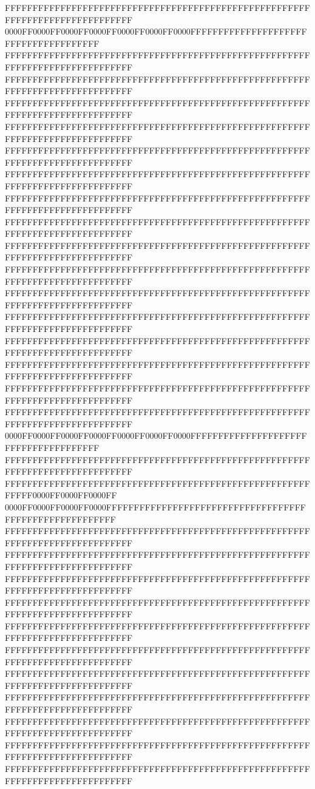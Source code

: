 FFFFFFFFFFFFFFFFFFFFFFFFFFFFFFFFFFFFFFFFFFFFFFFFFFFFFFFFFFFFFFFFFFFFFFFFFFFFFF
0000FF0000FF0000FF0000FF0000FF0000FF0000FFFFFFFFFFFFFFFFFFFFFFFFFFFFFFFFFFFFFF
FFFFFFFFFFFFFFFFFFFFFFFFFFFFFFFFFFFFFFFFFFFFFFFFFFFFFFFFFFFFFFFFFFFFFFFFFFFFFF
FFFFFFFFFFFFFFFFFFFFFFFFFFFFFFFFFFFFFFFFFFFFFFFFFFFFFFFFFFFFFFFFFFFFFFFFFFFFFF
FFFFFFFFFFFFFFFFFFFFFFFFFFFFFFFFFFFFFFFFFFFFFFFFFFFFFFFFFFFFFFFFFFFFFFFFFFFFFF
FFFFFFFFFFFFFFFFFFFFFFFFFFFFFFFFFFFFFFFFFFFFFFFFFFFFFFFFFFFFFFFFFFFFFFFFFFFFFF
FFFFFFFFFFFFFFFFFFFFFFFFFFFFFFFFFFFFFFFFFFFFFFFFFFFFFFFFFFFFFFFFFFFFFFFFFFFFFF
FFFFFFFFFFFFFFFFFFFFFFFFFFFFFFFFFFFFFFFFFFFFFFFFFFFFFFFFFFFFFFFFFFFFFFFFFFFFFF
FFFFFFFFFFFFFFFFFFFFFFFFFFFFFFFFFFFFFFFFFFFFFFFFFFFFFFFFFFFFFFFFFFFFFFFFFFFFFF
FFFFFFFFFFFFFFFFFFFFFFFFFFFFFFFFFFFFFFFFFFFFFFFFFFFFFFFFFFFFFFFFFFFFFFFFFFFFFF
FFFFFFFFFFFFFFFFFFFFFFFFFFFFFFFFFFFFFFFFFFFFFFFFFFFFFFFFFFFFFFFFFFFFFFFFFFFFFF
FFFFFFFFFFFFFFFFFFFFFFFFFFFFFFFFFFFFFFFFFFFFFFFFFFFFFFFFFFFFFFFFFFFFFFFFFFFFFF
FFFFFFFFFFFFFFFFFFFFFFFFFFFFFFFFFFFFFFFFFFFFFFFFFFFFFFFFFFFFFFFFFFFFFFFFFFFFFF
FFFFFFFFFFFFFFFFFFFFFFFFFFFFFFFFFFFFFFFFFFFFFFFFFFFFFFFFFFFFFFFFFFFFFFFFFFFFFF
FFFFFFFFFFFFFFFFFFFFFFFFFFFFFFFFFFFFFFFFFFFFFFFFFFFFFFFFFFFFFFFFFFFFFFFFFFFFFF
FFFFFFFFFFFFFFFFFFFFFFFFFFFFFFFFFFFFFFFFFFFFFFFFFFFFFFFFFFFFFFFFFFFFFFFFFFFFFF
FFFFFFFFFFFFFFFFFFFFFFFFFFFFFFFFFFFFFFFFFFFFFFFFFFFFFFFFFFFFFFFFFFFFFFFFFFFFFF
FFFFFFFFFFFFFFFFFFFFFFFFFFFFFFFFFFFFFFFFFFFFFFFFFFFFFFFFFFFFFFFFFFFFFFFFFFFFFF
0000FF0000FF0000FF0000FF0000FF0000FF0000FFFFFFFFFFFFFFFFFFFFFFFFFFFFFFFFFFFFFF
FFFFFFFFFFFFFFFFFFFFFFFFFFFFFFFFFFFFFFFFFFFFFFFFFFFFFFFFFFFFFFFFFFFFFFFFFFFFFF
FFFFFFFFFFFFFFFFFFFFFFFFFFFFFFFFFFFFFFFFFFFFFFFFFFFFFFFFFFFF0000FF0000FF0000FF
0000FF0000FF0000FF0000FFFFFFFFFFFFFFFFFFFFFFFFFFFFFFFFFFFFFFFFFFFFFFFFFFFFFFFF
FFFFFFFFFFFFFFFFFFFFFFFFFFFFFFFFFFFFFFFFFFFFFFFFFFFFFFFFFFFFFFFFFFFFFFFFFFFFFF
FFFFFFFFFFFFFFFFFFFFFFFFFFFFFFFFFFFFFFFFFFFFFFFFFFFFFFFFFFFFFFFFFFFFFFFFFFFFFF
FFFFFFFFFFFFFFFFFFFFFFFFFFFFFFFFFFFFFFFFFFFFFFFFFFFFFFFFFFFFFFFFFFFFFFFFFFFFFF
FFFFFFFFFFFFFFFFFFFFFFFFFFFFFFFFFFFFFFFFFFFFFFFFFFFFFFFFFFFFFFFFFFFFFFFFFFFFFF
FFFFFFFFFFFFFFFFFFFFFFFFFFFFFFFFFFFFFFFFFFFFFFFFFFFFFFFFFFFFFFFFFFFFFFFFFFFFFF
FFFFFFFFFFFFFFFFFFFFFFFFFFFFFFFFFFFFFFFFFFFFFFFFFFFFFFFFFFFFFFFFFFFFFFFFFFFFFF
FFFFFFFFFFFFFFFFFFFFFFFFFFFFFFFFFFFFFFFFFFFFFFFFFFFFFFFFFFFFFFFFFFFFFFFFFFFFFF
FFFFFFFFFFFFFFFFFFFFFFFFFFFFFFFFFFFFFFFFFFFFFFFFFFFFFFFFFFFFFFFFFFFFFFFFFFFFFF
FFFFFFFFFFFFFFFFFFFFFFFFFFFFFFFFFFFFFFFFFFFFFFFFFFFFFFFFFFFFFFFFFFFFFFFFFFFFFF
FFFFFFFFFFFFFFFFFFFFFFFFFFFFFFFFFFFFFFFFFFFFFFFFFFFFFFFFFFFFFFFFFFFFFFFFFFFFFF
FFFFFFFFFFFFFFFFFFFFFFFFFFFFFFFFFFFFFFFFFFFFFFFFFFFFFFFFFFFFFFFFFFFFFFFFFFFFFF
